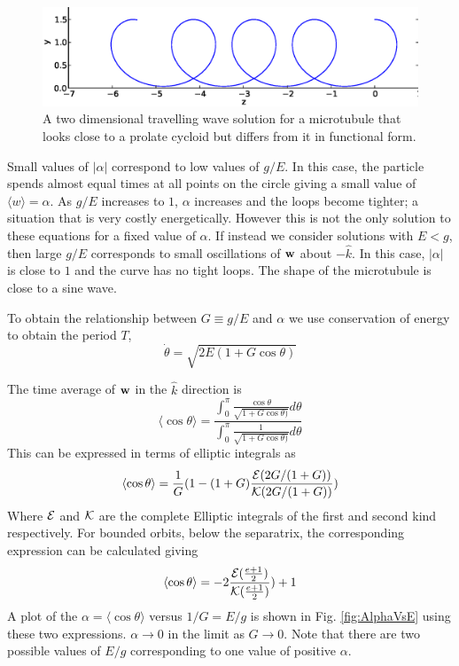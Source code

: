 \documentclass[pre,showpacs]{revtex4}
\def\bw{{\bf w}}
\begin{document}
\begin{figure}[htp]
\begin{center}
\includegraphics[width=\hsize]{shape1.eps}
\caption{ 
A two dimensional travelling wave solution for a microtubule that looks close to a prolate cycloid but
differs from it in functional form.
}
\label{fig:prolate}
\end{center}
\end{figure}

Small values of $|\alpha|$ correspond to low values of $g/E$. In this case, the particle spends almost
equal times at all points on the circle giving a small value of $\langle w\rangle = \alpha$. As $g/E$
increases to $1$, $\alpha$ increases and the loops become tighter; a situation that is very costly energetically.
However this is not the only solution to these equations for a fixed value of $\alpha$. If instead we
consider solutions with $E < g$, then large $g/E$ corresponds to small oscillations of $\bw$ about $-{\hat k}$.
In this case, $|\alpha|$ is close to $1$ and the curve has no tight loops. The shape of the microtubule
is close to a sine wave.

To obtain the relationship between $G \equiv g/E$ and $\alpha$ we use conservation of energy
to obtain the period $T$,
\begin{equation}
\label{eq:pendulumenergy}
\dot{\theta} = \sqrt{2E(1+G\cos\theta)}
\end{equation}

The time average of $\bw$ in the $\hat k$ direction is
\begin{equation}
\label{eq:avependulumcostheta}
\langle \cos\theta\rangle = \frac{\int_0^\pi \frac{\cos\theta}{\sqrt{1+G\cos\theta)}} d\theta}{\int_0^\pi \frac{1}{\sqrt{1+G\cos\theta)}} d\theta}
\end{equation}
This can be expressed in terms of elliptic integrals as
\begin{equation}
\label{eq:avecosthetaElliptic}
\langle \cos\theta\rangle =  \frac{1}{G} (1- (1+G) \frac{{\cal E}(2G/(1+G))}{{\cal K}(2G/(1+G))})
\end{equation}
Where  $\cal E$ and $\cal K$ are the complete Elliptic integrals of the first and second kind respectively.
For bounded orbits, below the separatrix, the corresponding expression can be calculated giving
\begin{equation}
\label{eq:avecosthetaEllipticBounded}
\langle \cos\theta\rangle =  -2 \frac{{\cal E}(\frac{e+1}{2})}{{\cal K} (\frac{e+1}{2}) }) + 1
\end{equation}
A plot of the $\alpha = \langle \cos\theta\rangle$ versus $1/G = E/g$ is shown in Fig. \ref{fig:AlphaVsE}
using these two expressions.
$\alpha \rightarrow 0$ in the limit as $G \rightarrow 0$. Note that there are two possible values of
$E/g$ corresponding to one value of positive $\alpha$.
\end{document}
